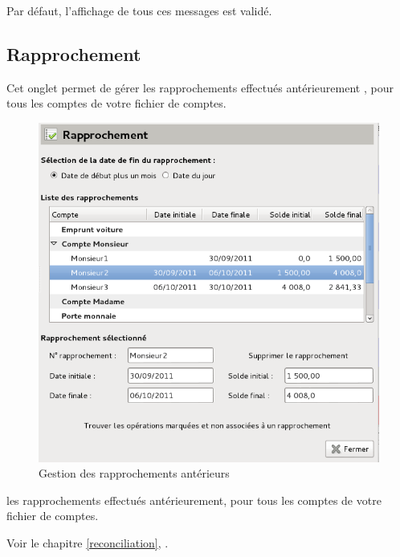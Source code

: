 \ifIllustration
\fi

Par défaut, l'affichage de tous ces messages est validé.

\ifIllustration
\fi


\subsection{Rapprochement\label{setup-operations-reconciliation}}

Cet onglet permet de gérer \ifIllustration les rapprochements effectués antérieurement , pour tous les comptes de votre fichier de comptes.

\begin{figure}[htb]
\begin{center}
\includegraphics[scale=0.5]{image/screenshot/setup_reconciliation}
\end{center}
\caption{Gestion des rapprochements antérieurs}
\label{setup-reconciliation-img}
\end{figure}
\else les rapprochements effectués antérieurement, pour tous les comptes de votre fichier de comptes.
\fi

Voir le chapitre \vref{reconciliation}, . 


